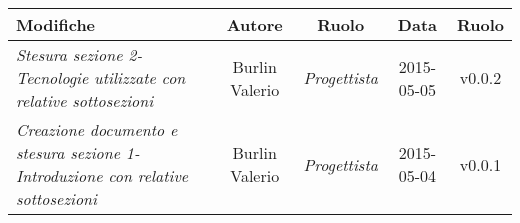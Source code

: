 \newpage

\begin{table}[h]
\centering
\begin{tabular}{|p{}|c|c|c|c|}
	\toprule
	\textbf{Modifiche} & \textbf{Autore} & \textbf{Ruolo} & \textbf{Data} & \textbf{Ruolo} \\
	\midrule
	\midrule
		\textit{Stesura sezione 2-Tecnologie utilizzate con relative sottosezioni} & Burlin Valerio & \textit{Progettista} & 2015-05-05 & v0.0.2 \\ 
	\midrule
		\textit{Creazione documento e stesura sezione 1-Introduzione con relative sottosezioni} & Burlin Valerio & \textit{Progettista} & 2015-05-04 & v0.0.1 \\
	\bottomrule
\end{tabular}	
\end{table}
\newpage